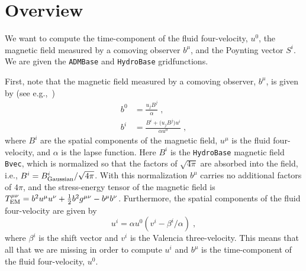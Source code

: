 \newenvironment{packed_itemize}{
\begin{itemize}
  \setlength{\itemsep}{0.0pt}
  \setlength{\parskip}{0.0pt}
  \setlength{\parsep}{ 0.0pt}
}{\end{itemize}}

\newenvironment{packed_enumerate}{
\begin{enumerate}
  \setlength{\itemsep}{0.0pt}
  \setlength{\parskip}{0.0pt}
  \setlength{\parsep}{ 0.0pt}
}{\end{enumerate}}

\begin{abstract}
  \thornname{} is an Einstein Toolkit thorn for computing the
  time-component of the fluid four-velocity, $u^0$, the magnetic field
  measured by a comoving observer $b^{\mu}$, and the Poynting vector
  $S^i$.
\end{abstract}


\section{Overview}
\label{sec:overview}

We want to compute the time-component of the fluid four-velocity, $u^0$,
the magnetic field measured by a comoving observer $b^{\mu}$, and the
Poynting vector $S^i$. We are given the \texttt{ADMBase} and
\texttt{HydroBase} gridfunctions.

First, note that the magnetic field measured by a comoving observer,
$b^{\mu}$, is given by (see e.g.,~\cite{duez2005relativistic})
\begin{align}
  b^{0} &= \frac{u_{j}B^{j}}{\alpha}\;,\\
  b^{i} &= \frac{B^{i} + \bigl(u_{j}B^{j}\bigr)u^{i}}{\alpha u^{0}}\;,
\end{align}
where $B^{i}$ are the spatial components of the magnetic field,
$u^{\mu}$ is the fluid four-velocity, and $\alpha$ is the lapse
function. Here $B^{i}$ is the \texttt{HydroBase} magnetic field
\texttt{Bvec}, which is normalized so that the factors of $\sqrt{4\pi}$
are absorbed into the field, i.e., $B^{i} = B^{i}_{\rm Gaussian}/\sqrt{4\pi}$.
With this normalization $b^{\mu}$ carries no additional factors of $4\pi$,
and the stress-energy tensor of the magnetic field is
$T^{\mu\nu}_{\rm EM} = b^{2}u^{\mu}u^{\nu} + \frac{1}{2}b^{2}g^{\mu\nu} - b^{\mu}b^{\nu}$.
Furthermore, the spatial components of the fluid four-velocity
are given by
\begin{equation}
  u^{i} = \alpha u^{0}\left(v^{i}-\beta^{i}/\alpha\right)\;,
\end{equation}
where $\beta^{i}$ is the shift vector and $v^{i}$ is the Valencia
three-velocity. This means that all that we are missing in order to
compute $u^{i}$ and $b^{\mu}$ is the time-component of the fluid
four-velocity, $u^{0}$.

